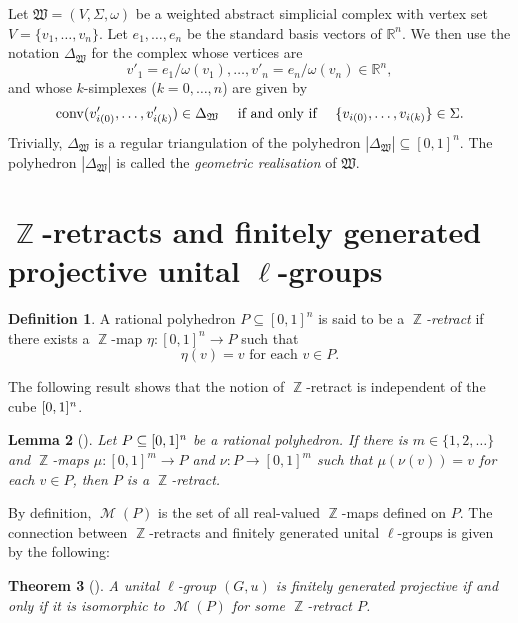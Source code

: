 \documentclass[reqno, draft]{amsart}
\newtheorem{theorem}{Theorem}[section]
\newtheorem{lemma}[theorem]{Lemma}
\theoremstyle{definition}
\newtheorem{definition}[theorem]{Definition}
\begin{document}
Let $\mathfrak{W}=(V,\Sigma, \omega)$ 
be a weighted abstract simplicial complex 
with vertex set $V=\{v_{1},\ldots,v_{n}\}$.
Let $e_{1},\ldots,e_{n}$ be the standard basis vectors 
of ${\mathbb{R}}^{n}$.
We then use the notation $\Delta_{\mathfrak{W}}$
for the complex whose vertices  are 
\[
   v'_{1} = e_{1}/\omega(v_{1}),\ldots,v'_{n}=e_{n}/\omega(v_{n})\in{\mathbb{R}}^n,
\]
and whose $k$-simplexes ($k=0,\ldots,n$) are given by
\[
  \operatorname{{\rm conv}}(v'_{i(0)},\ldots, v'_{i(k)})\in \Delta_{\mathfrak{W}}\quad
      \text{ if and only if }\quad
   \{ v_{i(0)},\ldots, v_{i(k)}\}\in \Sigma.
\]
Trivially, $\Delta_{\mathfrak{W}}$ is a regular triangulation 
of the polyhedron $|\Delta_{\mathfrak{W}}|\subseteq [0,1]^{n}$.  
The polyhedron $|\Delta_{\mathfrak{W}}|$ 
is called the {\it geometric realisation} of $\mathfrak{W}$.

\section{$\operatorname{\mathbb{Z}}$-retracts and finitely generated projective unital $\ell$-groups}

\begin{definition}
A rational polyhedron $P\subseteq [0,1]^n$ is said to be a 
{\it $\operatorname{\mathbb{Z}}$-retract} 
if there exists a $\operatorname{\mathbb{Z}}$-map $\eta\colon [0,1]^n\to P$ 
such that 
\[
\eta(v)=v\mbox{ for each }v\in P.
\]
\end{definition}

The following result shows that
 the notion of $\operatorname{\mathbb{Z}}$-retract is independent of the cube ${[0,1]^{\it n}}$.

\begin{lemma}[{\cite[Lemma~4.2]{CM2013}}]
\label{Lem:Independence}
Let $P\subseteq{[0,1]^{\it n}}$ be a rational polyhedron. 
If there is $m\in\{1,2,\ldots\}$ 
and $\operatorname{\mathbb{Z}}$-maps $\mu\colon [0,1]^m\to P$ 
and $\nu\colon P\to [0,1]^m$ 
such that $\mu(\nu(v))=v$ for each $v\in P$, 
then $P$ is a $\operatorname{\mathbb{Z}}$-retract.
\end{lemma}

By definition, $\operatorname{\mathscr M}(P)$ is the set of all 
real-valued $\operatorname{\mathbb{Z}}$-maps defined on $P$.
 The connection between $\operatorname{\mathbb{Z}}$-retracts 
and finitely generated unital $\ell$-groups
 is given by the following:
 
 
 
 
\begin{theorem}[{\cite[Theorem~4.1]{CM2013}}]
\label{Thm_Projective_Retraction} 
A  unital $\ell$-group $(G,u)$ is finitely generated projective 
if and only if it is isomorphic to $\operatorname{\mathscr M}(P)$ for some $\operatorname{\mathbb{Z}}$-retract $P$.
\end{theorem}
\end{document}
